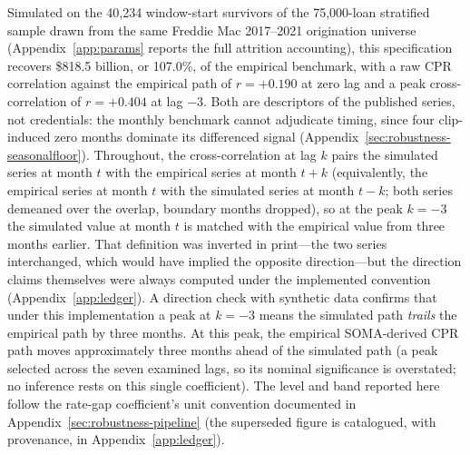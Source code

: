 \documentclass[12pt]{article}
\begin{document}
Simulated on the 40,234 window-start survivors of the 75,000-loan stratified sample drawn from the same Freddie Mac 2017--2021 origination universe (Appendix~\ref{app:params} reports the full attrition accounting), this specification recovers \$818.5 billion, or 107.0\%, of the empirical benchmark, with a raw CPR correlation against the empirical path of $r = +0.190$ at zero lag and a peak cross-correlation of $r = +0.404$ at lag $-3$. Both are descriptors of the published series, not credentials: the monthly benchmark cannot adjudicate timing, since four clip-induced zero months dominate its differenced signal (Appendix~\ref{sec:robustness-seasonalfloor}). Throughout, the cross-correlation at lag $k$ pairs the simulated series at month $t$ with the empirical series at month $t+k$ (equivalently, the empirical series at month $t$ with the simulated series at month $t-k$; both series demeaned over the overlap, boundary months dropped), so at the peak $k=-3$ the simulated value at month $t$ is matched with the empirical value from three months earlier. That definition was inverted in print---the two series interchanged, which would have implied the opposite direction---but the direction claims themselves were always computed under the implemented convention (Appendix~\ref{app:ledger}). A direction check with synthetic data confirms that under this implementation a peak at $k=-3$ means the simulated path \emph{trails} the empirical path by three months. At this peak, the empirical SOMA-derived CPR path moves approximately three months ahead of the simulated path (a peak selected across the seven examined lags, so its nominal significance is overstated; no inference rests on this single coefficient). The level and band reported here follow the rate-gap coefficient's unit convention documented in Appendix~\ref{sec:robustness-pipeline} (the superseded figure is catalogued, with provenance, in Appendix~\ref{app:ledger}).
\end{document}
